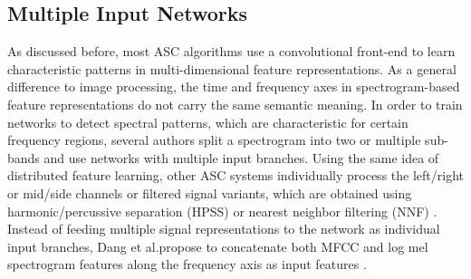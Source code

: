 \documentclass[applsci,article,submit,oneauthor,pdftex]{Definitions/mdpi}
\makeatletter
\newcommand{\etal}{{et al}.\@ }
\makeatother
\begin{document}
\subsection{Multiple Input Networks}
\label{sec:multiple_input}

As discussed before, most ASC algorithms use a convolutional front-end to learn characteristic patterns in multi-dimensional feature representations. As a general difference to image processing, the time and frequency axes in spectrogram-based feature representations do not carry the same semantic meaning. 
In order to train networks to detect spectral patterns, which are characteristic for certain frequency regions, several authors split a spectrogram into two \citep{Mcdonnell:2019:AcousticScenes:DCASE} or multiple \citep{Phaye:2019:Subspectralnet:ICASSP} sub-bands and use networks with multiple input branches.
Using the same idea of distributed feature learning, other ASC systems individually process the left/right or mid/side channels \citep{Mars:2019:BinauralASC:DCASE} or filtered signal variants, which are obtained using harmonic/percussive separation (HPSS) \citep{Mariotti:2018:DeepVisionASC:DCASE} or nearest neighbor filtering (NNF) \citep{Nguyen:2018:ASCEnsemble:DCASE}.
Instead of feeding multiple signal representations to the network as individual input branches, 
Dang \etal propose to concatenate both MFCC and log mel spectrogram features along the frequency axis as input features \citep{Dang:2018:ASCMulti:ICCE}.




\end{document}
